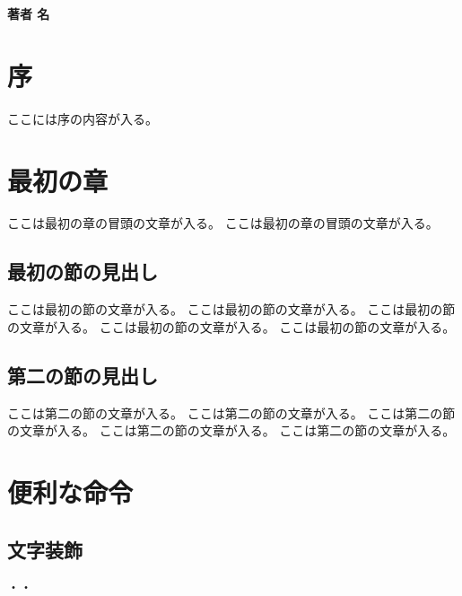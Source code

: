 \documentclass[ %
lualatex, %
tate, %
hanging_punctuation, %
paper=b6, %
reference_mark=interlinear, %
sidenote_length=10zw,       %
book %
]{jlreq}
\begin{document}
\begin{titlepage}
  \vspace*{10mm}
  \vfill

  \begin{flushright}
    {\gtfamily\bfseries\huge 著者 名}
  \end{flushright}
\end{titlepage}

{}
\chapter*{序}

ここには序の内容が入る。

\tableofcontents %


\chapter{最初の章}

ここは最初の章の冒頭の文章が入る。
ここは最初の章の冒頭の文章が入る。


\section{最初の節の見出し}

ここは最初の節の文章が入る。
ここは最初の節の文章が入る。
ここは最初の節の文章が入る。
ここは最初の節の文章が入る。
ここは最初の節の文章が入る。


\section{第二の節の見出し}

ここは第二の節の文章が入る。
ここは第二の節の文章が入る。
ここは第二の節の文章が入る。
ここは第二の節の文章が入る。
ここは第二の節の文章が入る。


\chapter{便利な命令}

\section{文字装飾}

  ・・
\end{document}
